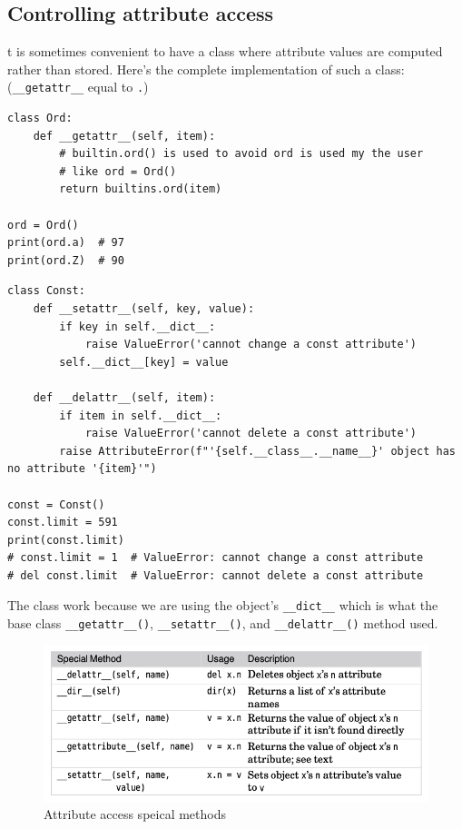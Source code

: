\subsection{Controlling attribute access}

t is sometimes convenient to have a class where attribute values are computed  rather than stored.
Here’s the complete implementation of such a class: (\verb|__getattr__| equal to \verb|.|)
\begin{lstlisting}
class Ord:
    def __getattr__(self, item):
        # builtin.ord() is used to avoid ord is used my the user
        # like ord = Ord()
        return builtins.ord(item)  

ord = Ord()
print(ord.a)  # 97
print(ord.Z)  # 90

\end{lstlisting}



\begin{lstlisting}
class Const:
    def __setattr__(self, key, value):
        if key in self.__dict__:
            raise ValueError('cannot change a const attribute')
        self.__dict__[key] = value

    def __delattr__(self, item):
        if item in self.__dict__:
            raise ValueError('cannot delete a const attribute')
        raise AttributeError(f"'{self.__class__.__name__}' object has no attribute '{item}'")

const = Const()
const.limit = 591
print(const.limit)
# const.limit = 1  # ValueError: cannot change a const attribute
# del const.limit  # ValueError: cannot delete a const attribute  
\end{lstlisting}


The class work because we are using the object's \verb|__dict__| which is what the base class \verb|__getattr__()|,
\verb|__setattr__()|, and \verb|__delattr__()| method used.




\begin{figure}[!ht]
  \centering
  \includegraphics[width=\textwidth]{pics/attribute-special-methods}
  \caption{Attribute access speical methods}
  \label{fig:attribute-special-methods}
\end{figure}





